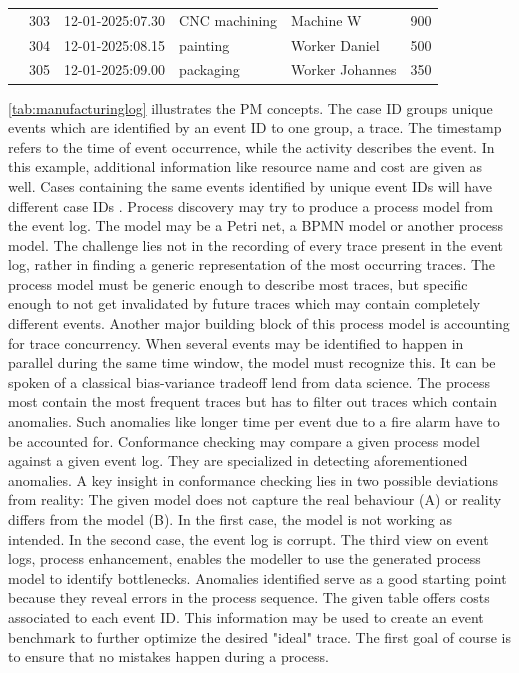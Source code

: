 \begin{table}[htbp]
{\begin{tabular}{r r l l l r}
                       & 303               & 12-01-2025:07.30   & CNC machining         & Machine W          & 900           \\
                       & 304               & 12-01-2025:08.15   & painting              & Worker Daniel      & 500           \\
                       & 305               & 12-01-2025:09.00   & packaging             & Worker Johannes    & 350           \\
      \bottomrule
    \end{tabular}%
  }
\end{table}

\autoref{tab:manufacturinglog} illustrates the PM concepts. The case ID groups unique events which are identified by an event ID to one group, a trace. The timestamp refers to the time of event occurrence, while the activity describes the event. In this example, additional information like resource name and cost are given as well. Cases containing the same events identified by unique event IDs will have different case IDs \autocite{van2016data}. Process discovery may try to produce a process model from the event log. The model may be a Petri net, a BPMN model or another process model. The challenge lies not in the recording of every trace present in the event log, rather in finding a generic representation of the most occurring traces. The process model must be generic enough to describe most traces, but specific enough to not get invalidated by future traces which may contain completely different events. Another major building block of this process model is accounting for trace concurrency. When several events may be identified to happen in parallel during the same time window, the model must recognize this. It can be spoken of a classical bias-variance tradeoff lend from data science. The process most contain the most frequent traces but has to filter out traces which contain anomalies. Such anomalies like longer time per event due to a fire alarm have to be accounted for. Conformance checking may compare a given process model against a given event log. They are specialized in detecting aforementioned anomalies. A key insight in conformance checking lies in two possible deviations from reality: The given model does not capture the real behaviour (A) or reality differs from the model (B). In the first case, the model is not working as intended. In the second case, the event log is corrupt. The third view on event logs, process enhancement, enables the modeller to use the generated process model to identify bottlenecks. Anomalies identified serve as a good starting point because they reveal errors in the process sequence. The given table offers costs associated to each event ID. This information may be used to create an event benchmark to further optimize the desired "ideal" trace. The first goal of course is to ensure that no mistakes happen during a process.

